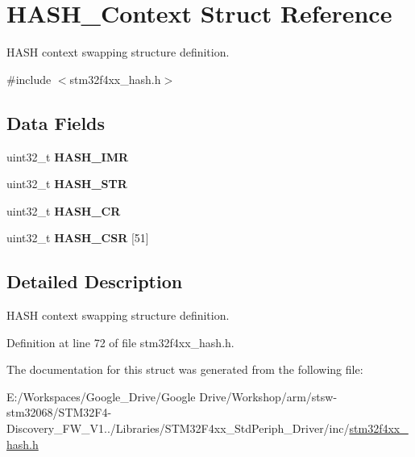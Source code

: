\hypertarget{struct_h_a_s_h___context}{\section{H\-A\-S\-H\-\_\-\-Context Struct Reference}
\label{struct_h_a_s_h___context}
}


H\-A\-S\-H context swapping structure definition.  




{\ttfamily \#include $<$stm32f4xx\-\_\-hash.\-h$>$}

\subsection*{Data Fields}
\begin{DoxyCompactItemize}
\item 
\hypertarget{struct_h_a_s_h___context_a1be47139d7d11eea10dd47ed78e8c60e}{uint32\-\_\-t {\bfseries H\-A\-S\-H\-\_\-\-I\-M\-R}}\label{struct_h_a_s_h___context_a1be47139d7d11eea10dd47ed78e8c60e}

\item 
\hypertarget{struct_h_a_s_h___context_ade129904b54583a02ee0baae5bed37f9}{uint32\-\_\-t {\bfseries H\-A\-S\-H\-\_\-\-S\-T\-R}}\label{struct_h_a_s_h___context_ade129904b54583a02ee0baae5bed37f9}

\item 
\hypertarget{struct_h_a_s_h___context_a079af6f7ef9899ca1e95abfa85ae3f20}{uint32\-\_\-t {\bfseries H\-A\-S\-H\-\_\-\-C\-R}}\label{struct_h_a_s_h___context_a079af6f7ef9899ca1e95abfa85ae3f20}

\item 
\hypertarget{struct_h_a_s_h___context_ae434e78a21548d340e1b4ab71fe062cd}{uint32\-\_\-t {\bfseries H\-A\-S\-H\-\_\-\-C\-S\-R} \mbox{[}51\mbox{]}}\label{struct_h_a_s_h___context_ae434e78a21548d340e1b4ab71fe062cd}

\end{DoxyCompactItemize}


\subsection{Detailed Description}
H\-A\-S\-H context swapping structure definition. 

Definition at line 72 of file stm32f4xx\-\_\-hash.\-h.



The documentation for this struct was generated from the following file\-:\begin{DoxyCompactItemize}
\item 
E\-:/\-Workspaces/\-Google\-\_\-\-Drive/\-Google Drive/\-Workshop/arm/stsw-\/stm32068/\-S\-T\-M32\-F4-\/\-Discovery\-\_\-\-F\-W\-\_\-\-V1../\-Libraries/\-S\-T\-M32\-F4xx\-\_\-\-Std\-Periph\-\_\-\-Driver/inc/\hyperlink{stm32f4xx__hash_8h}{stm32f4xx\-\_\-hash.\-h}\end{DoxyCompactItemize}
